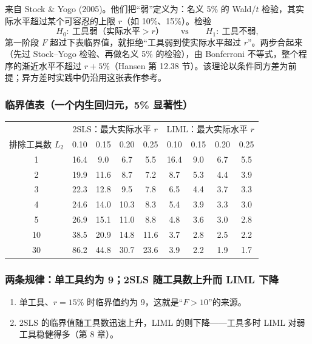 来自 Stock \& Yogo (2005)。他们把“弱”定义为：名义 5\% 的 Wald/$t$ 检验，其实际水平超过某个可容忍的上限 $r$（如 10\%、15\%）。检验
\[
H_0:\ \text{工具弱（实际水平}>r\text{）}\qquad\text{vs}\qquad H_1:\ \text{工具不弱},
\]
第一阶段 $F$ 超过下表临界值，就拒绝“工具弱到使实际水平超过 $r$”。两步合起来（先过 Stock--Yogo 检验、再做名义 5\% 的检验），由 Bonferroni 不等式，整个程序的渐近水平不超过 $r+5\%$（Hansen 第 12.38 节）。该理论以条件同方差为前提；异方差时实践中仍沿用这张表作参考。

\subsubsection{临界值表（一个内生回归元，5\% 显著性）}

\begin{center}
\small
\begin{tabular}{c|cccc|cccc}
\toprule
 & \multicolumn{4}{c|}{2SLS：最大实际水平 $r$} & \multicolumn{4}{c}{LIML：最大实际水平 $r$}\\
排除工具数 $L_2$ & 0.10 & 0.15 & 0.20 & 0.25 & 0.10 & 0.15 & 0.20 & 0.25\\
\midrule
1  & 16.4 & 9.0  & 6.7  & 5.5  & 16.4 & 9.0 & 6.7 & 5.5\\
2  & 19.9 & 11.6 & 8.7  & 7.2  & 8.7  & 5.3 & 4.4 & 3.9\\
3  & 22.3 & 12.8 & 9.5  & 7.8  & 6.5  & 4.4 & 3.7 & 3.3\\
4  & 24.6 & 14.0 & 10.3 & 8.3  & 5.4  & 3.9 & 3.3 & 3.0\\
5  & 26.9 & 15.1 & 11.0 & 8.8  & 4.8  & 3.6 & 3.0 & 2.8\\
10 & 38.5 & 20.9 & 14.8 & 11.6 & 3.7  & 2.8 & 2.5 & 2.2\\
30 & 86.2 & 44.8 & 30.7 & 23.6 & 3.9  & 2.2 & 1.9 & 1.7\\
\bottomrule
\end{tabular}
\label{tab:U09-sy}
\end{center}

\subsubsection{两条规律：单工具约为 9；2SLS 随工具数上升而 LIML 下降}

\begin{enumerate}[label=(\arabic*)]
  \item 单工具、$r=15\%$ 时临界值约为 9，这就是“$F>10$”的来源。
  \item 2SLS 的临界值随工具数迅速上升，LIML 的则下降——工具多时 LIML 对弱工具稳健得多（第 8 章）。
\end{enumerate}

